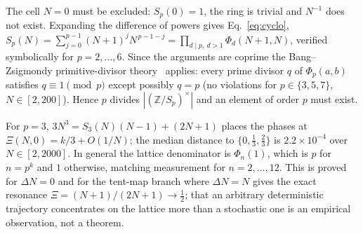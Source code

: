 \documentclass[11pt]{article}
\newcommand{\Xph}{\Xi}
\begin{document}
\noindent
The cell $N=0$ must be excluded: $S_p(0)=1$, the ring is trivial and $N^{-1}$
does not exist. Expanding the difference of powers gives Eq.~\eqref{eq:cyclo},
$S_p(N)=\sum_{j=0}^{p-1}(N+1)^{j}N^{\,p-1-j}=\prod_{d\mid p,\ d>1}\Phi_d(N+1,N)$,
verified symbolically for $p=2,\dots,6$. Since the arguments are coprime the
Bang--Zsigmondy primitive-divisor theory~\cite{zsigmondy} applies: every prime
divisor $q$ of $\Phi_p(a,b)$ satisfies $q\equiv1\pmod p$ except possibly $q=p$
(no violations for $p\in\{3,5,7\}$, $N\in[2,200]$). Hence $p$ divides
$|(\mathbb{Z}/S_p)^\times|$ and an element of order $p$ must exist.

For $p=3$, $3N^3=S_3(N)(N-1)+(2N+1)$ places the phases at
$\Xph(N,0)=k/3+O(1/N)$; the median distance to $\{0,\frac13,\frac23\}$ is
$2.2\times10^{-4}$ over $N\in[2,2000]$. In general the lattice denominator is
$\Phi_n(1)$, which is $p$ for $n=p^k$ and $1$ otherwise, matching measurement
for $n=2,\dots,12$. This is proved for $\Delta N=0$ and for the tent-map branch
where $\Delta N=N$ gives the exact resonance
$\Xph=(N{+}1)/(2N{+}1)\to\frac12$; that an arbitrary deterministic trajectory
concentrates on the lattice more than a stochastic one is an empirical
observation, not a theorem.



\end{document}
